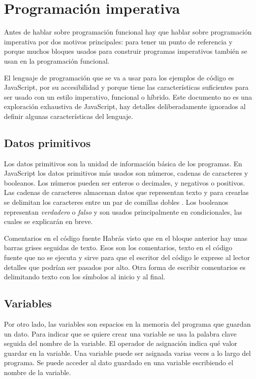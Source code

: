 \documentclass{article}
\newcommand{\code}[1]{\tcbox{\texttt{#1}}}
\newcommand{\codejs}[1]{\tcbox{\lstinline[style=ES6]{#1}}}
\begin{document}
\section*{Programación imperativa}
Antes de hablar sobre programación funcional hay que hablar sobre programación imperativa por dos motivos principales: para tener un punto de referencia y porque muchos bloques usados para construir programas imperativos también se usan en la programación funcional.

El lenguaje de programación que se va a usar para los ejemplos de código es JavaScript, por su accesibilidad y porque tiene las características suficientes\cite{why-js} para ser usado con un estilo imperativo, funcional o híbrido. Este documento no es una exploración exhaustiva de JavaScript, hay detalles deliberadamente ignorados al definir algunas características del lenguaje.

\subsection*{Datos primitivos}
Los datos primitivos son la unidad de información básica de los programas. En JavaScript los datos primitivos más usados son números, cadenas de caracteres y booleanos. Los números pueden ser enteros o decimales, y negativos o positivos. Las cadenas de caracteres almacenan datos que representan texto y para crearlas se delimitan los caracteres entre un par de comillas dobles \code{\textquotedbl\textquotedbl}. Los booleanos representan \textit{verdadero} o \textit{falso} y son usados principalmente en condicionales, las cuales se explicarán en breve.



\begin{bclogo}[logo=\bcinfo, couleurBarre=orange, noborder=true, couleur=white]{Comentarios en el código fuente}
Habrás visto que en el bloque anterior hay unas barras grises \code{//} seguidas de texto. Esos son los comentarios, texto en el código fuente que no se ejecuta y sirve para que el escritor del código le exprese al lector detalles que podrían ser pasados por alto.
\newline
Otra forma de escribir comentarios es delimitando texto con los símbolos \code{/*} al inicio y \code{*/} al final.
\end{bclogo}

\subsection*{Variables}
Por otro lado, las variables son espacios en la memoria del programa que guardan un dato. Para indicar que se quiere crear una variable se usa la palabra clave \codejs{let} seguida del nombre de la variable. El operador de asignación \codejs{=} indica qué valor guardar en la variable. Una variable puede ser asignada varias veces a lo largo del programa. Se puede acceder al dato guardado en una variable escribiendo el nombre de la variable.
\end{document}
